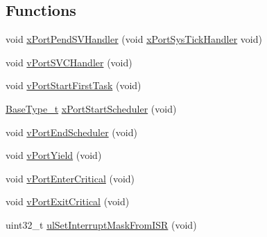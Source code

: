 \subsection*{Functions}
\begin{DoxyCompactItemize}
\item 
void \mbox{\hyperlink{thirdparty_2freertos_2freertos-10_80_80_2_source_2portable_2_g_c_c_2_a_r_m___c_m0_2port_8c_a3ab2189d6599a9eb1b1f235c87e8616d}{x\+Port\+Pend\+S\+V\+Handler}} (void \mbox{\hyperlink{thirdparty_2freertos_2freertos-10_80_80_2_source_2portable_2_g_c_c_2_a_r_m___c_m0_2port_8c_a78100b2d36913d0b45565be8975e5de8}{x\+Port\+Sys\+Tick\+Handler}} void)
\item 
void \mbox{\hyperlink{thirdparty_2freertos_2freertos-10_80_80_2_source_2portable_2_g_c_c_2_a_r_m___c_m0_2port_8c_a859e86b6143d6bc4cf96b2867f408c75}{v\+Port\+S\+V\+C\+Handler}} (void)
\item 
void \mbox{\hyperlink{thirdparty_2freertos_2freertos-10_80_80_2_source_2portable_2_g_c_c_2_a_r_m___c_m0_2port_8c_a5cfc38319f17c8e804020ec247b6325d}{v\+Port\+Start\+First\+Task}} (void)
\item 
\mbox{\hyperlink{portmacro_8h_a46fb21e00ae0729d7515c0fbf2269796}{Base\+Type\+\_\+t}} \mbox{\hyperlink{thirdparty_2freertos_2freertos-10_80_80_2_source_2portable_2_g_c_c_2_a_r_m___c_m0_2port_8c_ade5a8c6666e7413a0355cc252029c5c6}{x\+Port\+Start\+Scheduler}} (void)
\item 
void \mbox{\hyperlink{thirdparty_2freertos_2freertos-10_80_80_2_source_2portable_2_g_c_c_2_a_r_m___c_m0_2port_8c_af76f3c0b44c5b5c06fc046a4ee1a6423}{v\+Port\+End\+Scheduler}} (void)
\item 
void \mbox{\hyperlink{thirdparty_2freertos_2freertos-10_80_80_2_source_2portable_2_g_c_c_2_a_r_m___c_m0_2port_8c_add01c927fb689f7ec170e42d47d27927}{v\+Port\+Yield}} (void)
\item 
void \mbox{\hyperlink{thirdparty_2freertos_2freertos-10_80_80_2_source_2portable_2_g_c_c_2_a_r_m___c_m0_2port_8c_a2ed3554a3de09a3bd09d396ee081ab69}{v\+Port\+Enter\+Critical}} (void)
\item 
void \mbox{\hyperlink{thirdparty_2freertos_2freertos-10_80_80_2_source_2portable_2_g_c_c_2_a_r_m___c_m0_2port_8c_aed20ada05b957181a0de042802a82a5b}{v\+Port\+Exit\+Critical}} (void)
\item 
uint32\+\_\+t \mbox{\hyperlink{thirdparty_2freertos_2freertos-10_80_80_2_source_2portable_2_g_c_c_2_a_r_m___c_m0_2port_8c_a9f629ba0917b46bc9586dfc49df557ed}{ul\+Set\+Interrupt\+Mask\+From\+I\+SR}} (void)
\item 

\end{DoxyCompactItemize}
